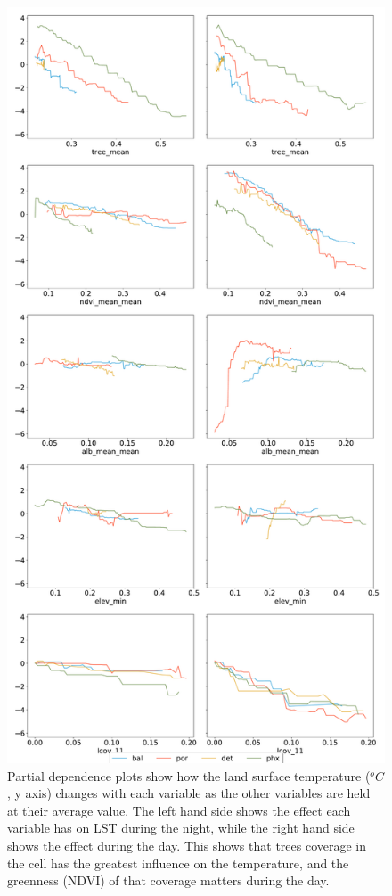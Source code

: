 \documentclass[]{elsarticle}
\begin{document}
\begin{figure}[h]
\begin{center}
\includegraphics[height=\textheight]{fig/report/partial_dependence.pdf}
\caption{Partial dependence plots show how the land surface temperature ($^oC$, y axis) changes with each variable as the other variables are held at their average value. The left hand side shows the effect each variable has on LST during the night, while the right hand side shows the effect during the day. This shows that trees coverage in the cell has the greatest influence on the temperature, and the greenness (NDVI) of that coverage matters during the day.}
\label{fig:pdp}
\end{center}
\end{figure}
\end{document}
